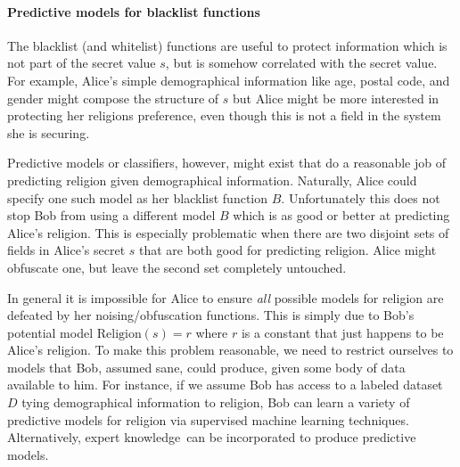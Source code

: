 \documentclass{article} %
\newcommand{\pxm}[1]{}
\theoremstyle{plain} %
\theoremstyle{definition} %
\begin{document}
\paragraph*{Predictive models for blacklist functions} The blacklist
(and whitelist) functions are useful to protect information which is
not part of the secret value $ s $, but is somehow correlated with the
secret value. For example, Alice's simple demographical information
like age, postal code, and gender might compose the structure of $ s $
but Alice might be more interested in protecting her religions
preference, even though this is not a field in the system she is
securing.

Predictive models or classifiers, however, might exist that do a
reasonable job of predicting religion given demographical
information. Naturally, Alice could specify one such model as her
blacklist function $ B $. Unfortunately this does not stop Bob from
using a different model $ B $ which is as good or better at predicting
Alice's religion. This is especially problematic when there are two
disjoint sets of fields in Alice's secret $ s $ that are both good for
predicting religion. Alice might obfuscate one, but leave the second
set completely untouched.

In general it is impossible for Alice to ensure \emph{all} possible
models for religion are defeated by her noising/obfuscation
functions. This is simply due to Bob's potential model $
\text{Religion}(s) = r $ where $ r $ is a constant that just happens
to be Alice's religion. To make this problem reasonable, we need to
restrict ourselves to models that Bob, assumed sane, could produce,
given some body of data available to him. For instance, if we assume
Bob has access to a labeled dataset $ D $ tying demographical information
to religion, Bob can learn a variety of predictive models for religion
via supervised machine learning techniques. Alternatively, expert knowledge\
can be incorporated to produce predictive models.

\end{document}
